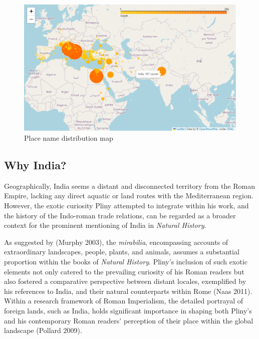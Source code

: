 \documentclass[
  12pt,
]{article}
\begin{document}
\begin{figure}

{\centering \includegraphics{NHthesis_structure_files/figure-pdf/fig-geonamemap_pdf-output-1.png}

}

\caption{\label{fig-geonamemap_pdf}Place name distribution map}

\end{figure}

\hypertarget{why-india}{%
\subsection{Why India?}\label{why-india}}

Geographically, India seems a distant and disconnected territory from
the Roman Empire, lacking any direct aquatic or land routes with the
Mediterranean region. However, the exotic curiosity Pliny attempted to
integrate within his work, and the history of the Indo-roman trade
relations, can be regarded as a broader context for the prominent
mentioning of India in \emph{Natural History}.

As suggested by (Murphy 2003), the \emph{mirabilia}, encompassing
accounts of extraordinary landscapes, people, plants, and animals,
assumes a substantial proportion within the books of \emph{Natural
History}. Pliny's inclusion of such exotic elements not only catered to
the prevailing curiosity of his Roman readers but also fostered a
comparative perspective between distant locales, exemplified by his
references to India, and their natural counterparts within Rome (Naas
2011). Within a research framework of Roman Imperialism, the detailed
portrayal of foreign lands, such as India, holds significant importance
in shaping both Pliny's and his contemporary Roman readers' perception
of their place within the global landscape (Pollard 2009).
\end{document}
